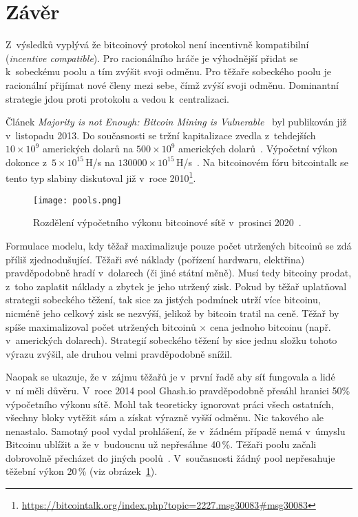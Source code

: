 
\section{Závěr}
\label{sec_zaver}

Z~výsledků vyplývá že bitcoinový protokol není incentivně kompatibilní (\textit{incentive compatible}). Pro racionálního hráče je výhodnější přidat se k~sobeckému poolu a tím zvýšit svoji odměnu. Pro těžaře sobeckého poolu je racionální přijímat nové členy mezi sebe, čímž zvýší svoji odměnu. Dominantní strategie jdou proti protokolu a vedou k~centralizaci.

Článek \textit{Majority is not Enough: Bitcoin Mining is Vulnerable}~\cite{bib_paper} byl publikován již v~listopadu 2013. Do současnosti se tržní kapitalizace zvedla z~tehdejších $10 \times 10^{9}$ amerických dolarů na $500 \times 10^{9}$ amerických dolarů~\cite{bib_market_cap}. Výpočetní výkon dokonce z~$5 \times 10^{15}$\,H/s na $130 000\times 10^{15}$\,H/s~\cite{bib_hash_rate}. Na bitcoinovém fóru bitcointalk se tento typ slabiny diskutoval již v~roce 2010\footnote{\url{https://bitcointalk.org/index.php?topic=2227.msg30083\#msg30083}}.

\begin{figure}[ht]
    \centering
    \texttt{[image: pools.png]}
    \caption{Rozdělení výpočetního výkonu bitcoinové sítě v~prosinci 2020~\cite{bib_pool_dist}.}
    \label{fig_pool_distribution}
\end{figure}

Formulace modelu, kdy těžař maximalizuje pouze počet utržených bitcoinů se zdá příliš zjednodušující. Těžaři své náklady (pořízení hardwaru, elektřina) pravděpodobně hradí v~dolarech (či jiné státní měně). Musí tedy bitcoiny prodat, z~toho zaplatit náklady a zbytek je jeho utržený zisk. Pokud by těžař uplatňoval strategii sobeckého těžení, tak sice za jistých podmínek utrží více bitcoinu, nicméně jeho celkový zisk se nezvýší, jelikož by bitcoin tratil na ceně. Těžař by spíše maximalizoval počet utržených bitcoinů $\times$ cena jednoho bitcoinu (např. v~amerických dolarech). Strategií sobeckého těžení by sice jednu složku tohoto výrazu zvýšil, ale druhou velmi pravděpodobně snížil.

Naopak se ukazuje, že v~zájmu těžařů je v~první řadě aby síť fungovala a lidé v~ní měli důvěru. V~roce 2014 pool Ghash.io pravděpodobně přesáhl hranici 50\% výpočetního výkonu sítě. Mohl tak teoreticky ignorovat práci všech ostatních, všechny bloky vytěžit sám a získat výrazně vyšší odměnu. Nic takového ale nenastalo. Samotný pool vydal prohlášení, že v~žádném případě nemá v~úmyslu Bitcoinu ublížit a že v~budoucnu už nepřesáhne 40\,\%. Těžaři poolu začali dobrovolně přecházet do jiných poolů~\cite{bib_coindesk_ghash}. V~současnosti žádný pool nepřesahuje těžební výkon 20\,\% (viz obrázek~\ref{fig_pool_distribution}).

